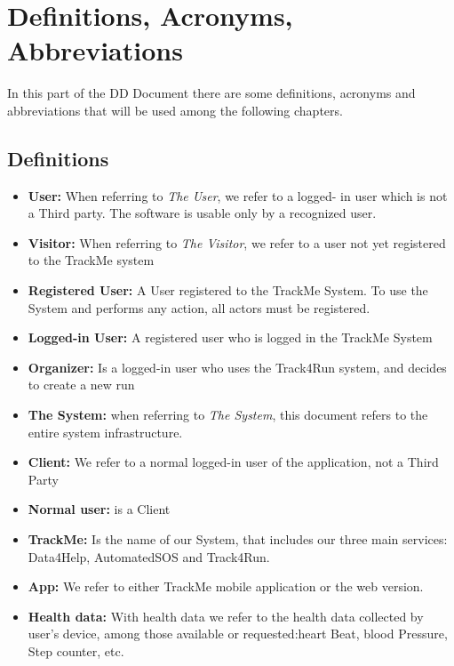 \section{Definitions, Acronyms, Abbreviations}
In this part of the DD Document there are some definitions, acronyms and abbreviations that will be used among the following chapters.
\subsection{Definitions}
\begin{itemize}

\item \textbf{User:} When referring to \emph{The User}, we refer to a logged- in user which is not a Third party. The software is usable only by a recognized user. 

\item \textbf{Visitor:} When referring to \emph{The Visitor}, we refer to a user not yet registered to the TrackMe system

\item \textbf{Registered User:} A User registered to the TrackMe System. To use the System and performs any action, all actors must be registered. 

\item\textbf{Logged-in User:} A registered user who is logged in the TrackMe System

\item\textbf{Organizer:} Is a logged-in  user who uses the Track4Run system, and decides to create a new run
\item \textbf{The System:} when referring to \emph{The System}, this document refers to the entire system infrastructure.

\item \textbf{Client:} We refer to a normal logged-in user of the application, not a Third Party
\item\textbf{Normal user: } is a Client

\item\textbf{TrackMe:}
Is the name of our System, that  includes our three main services: Data4Help, AutomatedSOS and Track4Run.
\item\textbf{App:} We refer to either TrackMe mobile application or the web version.

\item\textbf{Health data:} With health data we refer to the health data collected by user's device, among those available or requested:heart Beat, blood Pressure, Step counter, etc.


\end{itemize}
